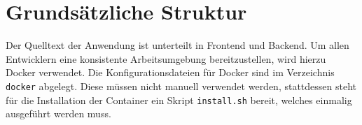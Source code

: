 \section{Grundsätzliche Struktur}
\label{sec:grundsatzliche_struktur}

  Der Quelltext der Anwendung ist unterteilt in Frontend und Backend. Um allen Entwicklern eine konsistente
  Arbeitsumgebung bereitzustellen, wird hierzu Docker verwendet. Die Konfigurationsdateien für Docker
  sind im Verzeichnis \verb+docker+ abgelegt. Diese müssen nicht manuell verwendet werden, stattdessen
  steht für die Installation der Container ein Skript \verb+install.sh+ bereit, welches einmalig ausgeführt werden
  muss.

